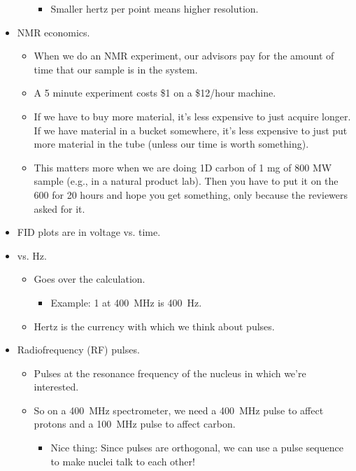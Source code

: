 \documentclass[../notes.tex]{subfiles}
\begin{document}
\begin{itemize}
\begin{itemize}
\begin{itemize}
            \item Smaller hertz per point means higher resolution.
        \end{itemize}
    \end{itemize}
    \item NMR economics.
    \begin{itemize}
        \item When we do an NMR experiment, our advisors pay for the amount of time that our sample is in the system.
        \item A 5 minute experiment costs \$1 on a \$12/hour machine.
        \item If we have to buy more material, it's less expensive to just acquire longer. If we have material in a bucket somewhere, it's less expensive to just put more material in the tube (unless our time is worth something).
        \item This matters more when we are doing 1D carbon of 1 mg of 800 MW sample (e.g., in a natural product lab). Then you have to put it on the 600 for 20 hours and hope you get something, only because the reviewers asked for it.
    \end{itemize}
    \item FID plots are in voltage vs. time.
    \item \si{\partspermillion} vs. \si{\hertz}.
    \begin{itemize}
        \item Goes over the calculation.
        \begin{itemize}
            \item Example: \SI{1}{\partspermillion} at \SI{400}{\mega\hertz} is \SI{400}{\hertz}.
        \end{itemize}
        \item Hertz is the currency with which we think about pulses.
    \end{itemize}
    \item Radiofrequency (RF) pulses.
    \begin{itemize}
        \item Pulses at the resonance frequency of the nucleus in which we're interested.
        \item So on a \SI{400}{\mega\hertz} spectrometer, we need a \SI{400}{\mega\hertz} pulse to affect protons and a \SI{100}{\mega\hertz} pulse to affect carbon.
        \begin{itemize}
            \item Nice thing: Since pulses are orthogonal, we can use a pulse sequence to make nuclei talk to each other!

\end{itemize}
\end{itemize}
\end{itemize}
\end{document}
